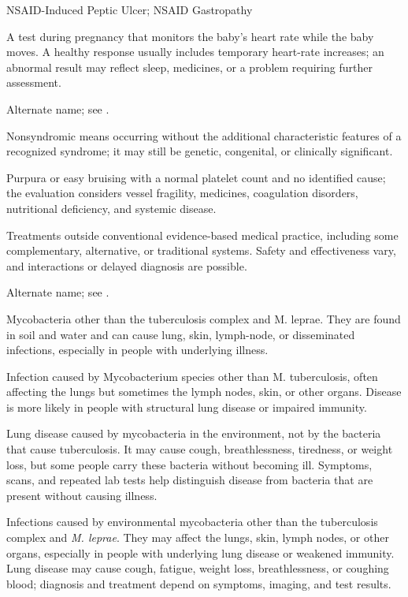 \synonyms
NSAID-Induced Peptic Ulcer; NSAID Gastropathy

 A test during pregnancy that monitors the baby's heart rate while the baby moves. A healthy response usually includes temporary heart-rate increases; an abnormal result may reflect sleep, medicines, or a problem requiring further assessment.

 Alternate name; see .

 Nonsyndromic means occurring without the additional characteristic features of a recognized syndrome; it may still be genetic, congenital, or clinically significant.

 Purpura or easy bruising with a normal platelet count and no identified cause; the evaluation considers vessel fragility, medicines, coagulation disorders, nutritional deficiency, and systemic disease.

 Treatments outside conventional evidence-based medical practice, including some complementary, alternative, or traditional systems. Safety and effectiveness vary, and interactions or delayed diagnosis are possible.

 Alternate name; see .

 Mycobacteria other than the tuberculosis complex and M. leprae. They are found in soil and water and can cause lung, skin, lymph-node, or disseminated infections, especially in people with underlying illness.

 Infection caused by Mycobacterium species other than M. tuberculosis, often affecting the lungs but sometimes the lymph nodes, skin, or other organs. Disease is more likely in people with structural lung disease or impaired immunity.

 Lung disease caused by
mycobacteria in the environment, not by the bacteria that cause tuberculosis.
It may cause cough, breathlessness, tiredness, or weight loss, but some people
carry these bacteria without becoming ill. Symptoms, scans, and repeated lab tests
help distinguish disease from bacteria that are present without causing illness.

 Infections caused by environmental mycobacteria other than the tuberculosis complex and \textit{M. leprae}. They may affect the lungs, skin, lymph nodes, or other organs, especially in people with underlying lung disease or weakened immunity. Lung disease may cause cough, fatigue, weight loss, breathlessness, or coughing blood; diagnosis and treatment depend on symptoms, imaging, and test results.

